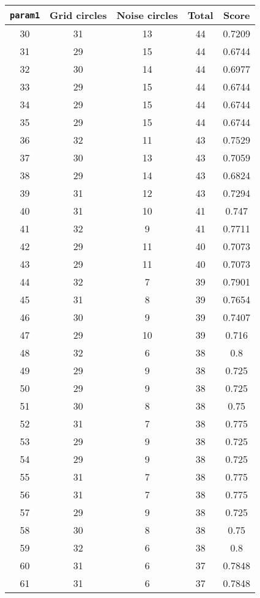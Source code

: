 \documentclass[letterpaper, 12pt]{article}
\begin{document}
\begin{longtable}{|c|c|c|c|c|}
\hline
\textbf{\texttt{param1}} & \textbf{Grid circles} & \textbf{Noise circles} & \textbf{Total} & \textbf{Score} \\
\hline
30 & 31 & 13 & 44 & 0.7209 \\
\hline
31 & 29 & 15 & 44 & 0.6744 \\
\hline
32 & 30 & 14 & 44 & 0.6977 \\
\hline
33 & 29 & 15 & 44 & 0.6744 \\
\hline
34 & 29 & 15 & 44 & 0.6744 \\
\hline
35 & 29 & 15 & 44 & 0.6744 \\
\hline
36 & 32 & 11 & 43 & 0.7529 \\
\hline
37 & 30 & 13 & 43 & 0.7059 \\
\hline
38 & 29 & 14 & 43 & 0.6824 \\
\hline
39 & 31 & 12 & 43 & 0.7294 \\
\hline
40 & 31 & 10 & 41 & 0.747 \\
\hline
41 & 32 & 9 & 41 & 0.7711 \\
\hline
42 & 29 & 11 & 40 & 0.7073 \\
\hline
43 & 29 & 11 & 40 & 0.7073 \\
\hline
44 & 32 & 7 & 39 & 0.7901 \\
\hline
45 & 31 & 8 & 39 & 0.7654 \\
\hline
46 & 30 & 9 & 39 & 0.7407 \\
\hline
47 & 29 & 10 & 39 & 0.716 \\
\hline
48 & 32 & 6 & 38 & 0.8 \\
\hline
49 & 29 & 9 & 38 & 0.725 \\
\hline
50 & 29 & 9 & 38 & 0.725 \\
\hline
51 & 30 & 8 & 38 & 0.75 \\
\hline
52 & 31 & 7 & 38 & 0.775 \\
\hline
53 & 29 & 9 & 38 & 0.725 \\
\hline
54 & 29 & 9 & 38 & 0.725 \\
\hline
55 & 31 & 7 & 38 & 0.775 \\
\hline
56 & 31 & 7 & 38 & 0.775 \\
\hline
57 & 29 & 9 & 38 & 0.725 \\
\hline
58 & 30 & 8 & 38 & 0.75 \\
\hline
59 & 32 & 6 & 38 & 0.8 \\
\hline
60 & 31 & 6 & 37 & 0.7848 \\
\hline
61 & 31 & 6 & 37 & 0.7848 \\

\end{longtable}
\end{document}
